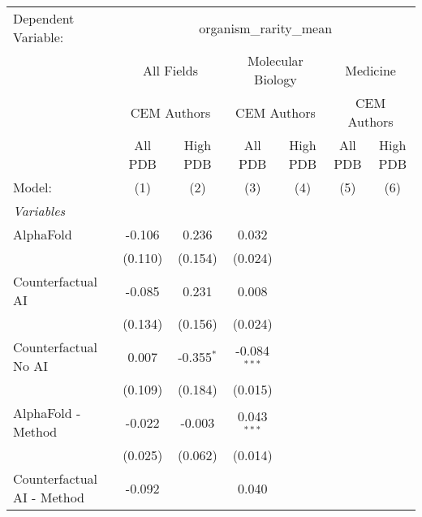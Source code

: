 \begingroup
\centering
\begin{tabular}{lcccccc}
   \tabularnewline \midrule \midrule
   Dependent Variable: & \multicolumn{6}{c}{organism\_rarity\_mean}\\
 & \multicolumn{2}{c}{All Fields} & \multicolumn{2}{c}{Molecular Biology} & \multicolumn{2}{c}{Medicine} \\
\cmidrule(lr){2-3} \cmidrule(lr){4-5} \cmidrule(lr){6-7}
 & \multicolumn{2}{c}{CEM Authors} & \multicolumn{2}{c}{CEM Authors} & \multicolumn{2}{c}{CEM Authors} \\
\cmidrule(lr){2-3} \cmidrule(lr){4-5} \cmidrule(lr){6-7}
 & \multicolumn{1}{c}{All PDB} & \multicolumn{1}{c}{High PDB} & \multicolumn{1}{c}{All PDB} & \multicolumn{1}{c}{High PDB} & \multicolumn{1}{c}{All PDB} & \multicolumn{1}{c}{High PDB} \\
\cmidrule(lr){2-2} \cmidrule(lr){3-3} \cmidrule(lr){4-4} \cmidrule(lr){5-5} \cmidrule(lr){6-6} \cmidrule(lr){7-7}
   Model:                                                     & (1)          & (2)          & (3)            & (4) & (5) & (6)\\  
   \midrule
   \emph{Variables}\\
   AlphaFold                                                  & -0.106       & 0.236        & 0.032          &     &     &   \\   
                                                              & (0.110)      & (0.154)      & (0.024)        &     &     &   \\   
   Counterfactual AI                                          & -0.085       & 0.231        & 0.008          &     &     &   \\   
                                                              & (0.134)      & (0.156)      & (0.024)        &     &     &   \\   
   Counterfactual No AI                                       & 0.007        & -0.355$^{*}$ & -0.084$^{***}$ &     &     &   \\   
                                                              & (0.109)      & (0.184)      & (0.015)        &     &     &   \\   
   AlphaFold - Method                                         & -0.022       & -0.003       & 0.043$^{***}$  &     &     &   \\   
                                                              & (0.025)      & (0.062)      & (0.014)        &     &     &   \\   
   Counterfactual AI - Method                                 & -0.092       &              & 0.040          &     &     &   \\   

\end{tabular}
